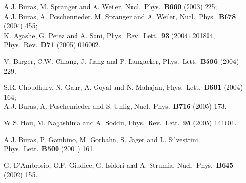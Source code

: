 \documentclass[11pt]{cernrep}
\begin{document}
\begin{thebibliography}{999}
A.J. Buras, M. Spranger and A. Weiler,
  { Nucl.\ Phys.}~{\bf B660} (2003) 225;\\
  A.J. Buras, A. Poschenrieder, M. Spranger and A. Weiler,
 {  Nucl.\ Phys.}~{\bf B678} (2004) 455;\\
  K. Agashe, G. Perez and A. Soni,
  { Phys.\ Rev.\ Lett.}~{\bf 93} (2004) 201804,
  { Phys.\ Rev.}~{\bf D71} (2005) 016002.

V. Barger, C.W. Chiang, J. Jiang and P. Langacker,
  { Phys.\ Lett.}~{\bf B596} (2004) 229.

S.R. Choudhury, N. Gaur, A. Goyal and N. Mahajan,
  { Phys.\ Lett.}~{\bf B601} (2004) 164;\\
  A.J. Buras, A. Poschenrieder and S. Uhlig,
 { Nucl.\ Phys.}~{\bf B716} (2005) 173.

  W.S. Hou, M. Nagashima and A. Soddu,
  { Phys.\ Rev.\ Lett.}~{\bf 95} (2005) 141601.
  
A.J. Buras, P. Gambino, M. Gorbahn, S. J\"ager and L. Silvestrini,
  { Phys.\ Lett.}~{\bf B500} (2001) 161.

G. D'Ambrosio, G.F. Giudice, G. Isidori and A. Strumia,
  { Nucl.\ Phys.}~{\bf B645} (2002) 155.
  

\end{thebibliography}
\end{document}
